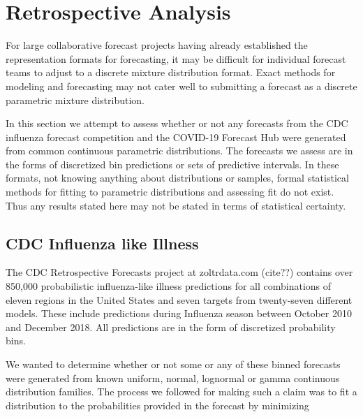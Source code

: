 \documentclass[11pt,notitlepage]{isuthesis}
\begin{document}





















\chapter{Retrospective Analysis}
\label{section:retrostud}

For large collaborative forecast projects having already established the 
representation formats for forecasting, it may be difficult for individual
forecast teams to adjust to a discrete mixture distribution format. Exact 
methods for modeling and forecasting may not cater well to submitting a forecast
as a discrete parametric mixture distribution.

In this section we attempt to assess whether or not any forecasts from the CDC
influenza forecast competition and the COVID-19 Forecast Hub were generated from
common continuous parametric distributions. The forecasts we assess are in the 
forms of discretized bin predictions or sets of predictive intervals. In these
formats, not knowing anything about distributions or samples,  formal 
statistical methods for fitting to parametric distributions 
and assessing fit do not exist. Thus any results stated here may not be stated
in terms of statistical certainty.


\section{CDC Influenza like Illness}
The CDC Retrospective Forecasts project at zoltrdata.com (cite??) contains over
850,000 probabilistic influenza-like illness predictions for all combinations
of eleven regions 
in the United States and seven targets from twenty-seven different models. These
include predictions during Influenza season between October 2010 and December
2018. All predictions are in the form of discretized probability bins. 

We wanted to determine whether or not some or any of these binned forecasts were
generated from known uniform, normal, 
lognormal or gamma continuous distribution families. 
The process we followed for making such a claim was
to fit a distribution to the probabilities provided in the forecast by
minimizing
\end{document}
